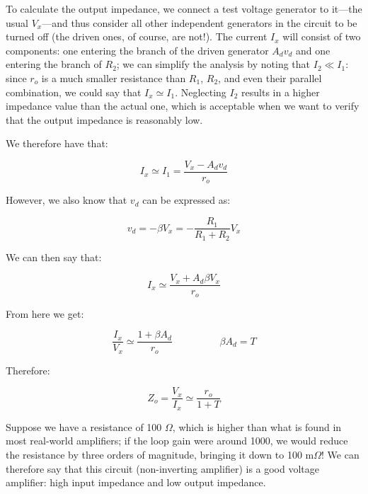 \documentclass[../main.tex]{subfiles}
\begin{document}
To calculate the output impedance, we connect a test voltage generator to it—the usual $V_x$—and thus consider all other independent generators in the circuit to be turned off (the driven ones, of course, are not!). The current $I_x$ will consist of two components: one entering the branch of the driven generator $A_dv_d$ and one entering the branch of $R_2$; we can simplify the analysis by noting that $I_2 \ll I_1$:  since $r_o$ is a much smaller resistance than $R_1$, $R_2$, and even their parallel combination, we could say that $I_x  \simeq I_1$. Neglecting $I_2$ results in a higher impedance value than the actual one, which is acceptable when we want to verify that the output impedance is reasonably low. 

We therefore have that:

\begin{equation}
	I_x \simeq I_1 = \frac{V_x - A_dv_d}{r_o}
\end{equation}

However, we also know that $v_d$ can be expressed as:

\begin{equation}
	v_d = - \beta V_x = -\frac{R_1}{R_1 + R_2} V_x
\end{equation}

We can then say that:


\begin{equation}
		I_x \simeq \frac{V_x + A_d \beta V_x}{r_o}
\end{equation}


From here we get:

\begin{equation}
	\frac{I_x}{V_x} \simeq \frac{1+ \beta A_d}{r_o} \hspace{2cm} \beta A_d = T
\end{equation}

Therefore:

\begin{equation}
	Z_o = \frac{V_x}{I_x} \simeq \frac{r_o}{1 + T}
\end{equation}



Suppose we have a resistance of 100 $\Omega$, which is higher than what is found in most real-world amplifiers; if the loop gain were around 1000, we would reduce the resistance by three orders of magnitude, bringing it down to 100 m$\Omega$! 
We can therefore say that this circuit (non-inverting amplifier) is a good voltage amplifier: high input impedance and low output impedance.
\end{document}
